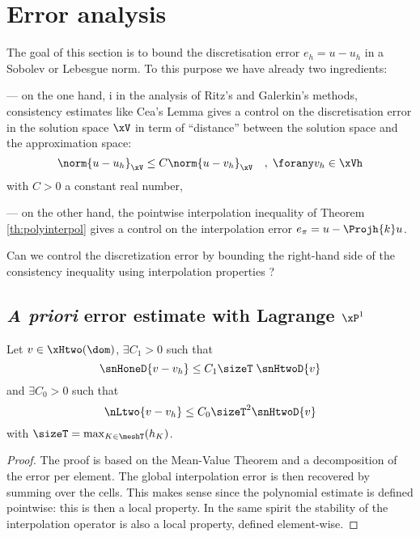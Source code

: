 
\chapter{Error analysis}\label{sec:error_analysis}

The goal of this section is to bound the discretisation error $e_h = u - u_h$ in a Sobolev or Lebesgue norm.
To this purpose we have already two ingredients:

--- on the one hand, i in the analysis of Ritz's and Galerkin's methods, consistency estimates like Cea's Lemma gives a control on the discretisation error in the solution space $\xV$ in term of ``distance'' between the solution space and the approximation space:
\begin{equation*}
\norm{u - u_h}_\xV  \leq C \norm{u - v_h}_\xV\quad,\; \forany v_h \in \xVh
\end{equation*}
with $C > 0$ a constant real number,

--- on the other hand, the pointwise interpolation inequality of Theorem \eqref{th:polyinterpol} gives a control on the interpolation error $e_{\pi} = u - \Projh{k} u$.

\medskip
\Question Can we control the discretization error by bounding the right-hand side of the consistency inequality using interpolation properties ?

\section{\textit{A priori} error estimate with Lagrange $\xP^1$}

\begin{thrm}
Let $v \in \xHtwo(\dom)$, $\exists C_1 > 0$ such that
\begin{equation}
\snHoneD{v - v_h}  \leq C_1 \sizeT\;\snHtwoD{v}
\end{equation}
and $\exists C_0 > 0$ such that
\begin{equation}
\nLtwo{v - v_h}  \leq C_0 \sizeT^2 \snHtwoD{v}
\end{equation}
with $\sizeT = \max_{K\in\meshT}(h_K)$.
\end{thrm}
\begin{proof}
The proof is based on the Mean-Value Theorem and a decomposition of the error per element.
The global interpolation error is then recovered by summing over the cells.
This makes sense since the polynomial estimate is defined pointwise: this is then a local property.
In the same spirit the stability of the interpolation operator is also a local property, defined element-wise.
\end{proof}


